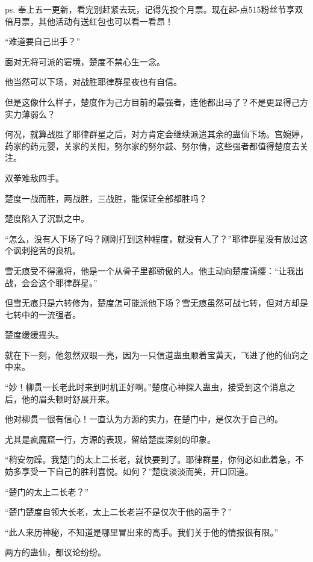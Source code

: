 
\begin{this_body}



ps. 奉上五一更新，看完别赶紧去玩，记得先投个月票。现在起-点515粉丝节享双倍月票，其他活动有送红包也可以看一看昂！

“难道要自己出手？”

面对无将可派的窘境，楚度不禁心生一念。

他当然可以下场，对战胜耶律群星夜也有自信。

但是这像什么样子，楚度作为己方目前的最强者，连他都出马了？不是更显得己方实力薄弱么？

何况，就算战胜了耶律群星之后，对方肯定会继续派遣其余的蛊仙下场。宫婉婷，药家的药元婴，关家的关阳，努尔家的努尔鼓、努尔倩，这些强者都值得楚度去关注。

双拳难敌四手。

楚度一战而胜，两战胜，三战胜，能保证全部都胜吗？

楚度陷入了沉默之中。

“怎么，没有人下场了吗？刚刚打到这种程度，就没有人了？”耶律群星没有放过这个讽刺挖苦的良机。

雪无痕受不得激将，他是一个从骨子里都骄傲的人。他主动向楚度请缨：“让我出战，会会这个耶律群星。”

但雪无痕只是六转修为，楚度怎可能派他下场？雪无痕虽然可战七转，但对方却是七转中的一流强者。

楚度缓缓摇头。

就在下一刻，他忽然双眼一亮，因为一只信道蛊虫顺着宝黄天，飞进了他的仙窍之中来。

“妙！柳贯一长老此时来到时机正好啊。”楚度心神探入蛊虫，接受到这个消息之后，他的眉头顿时舒展开来。

他对柳贯一很有信心！一直认为方源的实力，在楚门中，是仅次于自己的。

尤其是疯魔窟一行，方源的表现，留给楚度深刻的印象。

“稍安勿躁。我楚门的太上二长老，就快要到了。耶律群星，你何必如此着急，不妨多享受一下自己的胜利喜悦。如何？”楚度淡淡而笑，开口回道。

“楚门的太上二长老？”

“楚门楚度自领大长老，太上二长老岂不是仅次于他的高手？”

“此人来历神秘，不知道是哪里冒出来的高手。我们关于他的情报很有限。”

两方的蛊仙，都议论纷纷。


\end{this_body}
